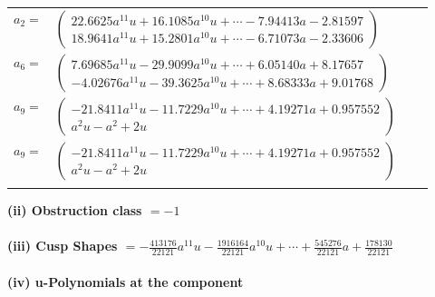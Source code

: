 \documentclass[1p]{elsarticle_modified}
\theoremstyle{definition}
\begin{document}
\begin{tabular}{m{7pt} m{180pt} m{7pt} m{180pt} }
\flushright $a_{2}=$&$\begin{pmatrix}22.6625 a^{11} u+16.1085 a^{10} u+\cdots-7.94413 a-2.81597\\18.9641 a^{11} u+15.2801 a^{10} u+\cdots-6.71073 a-2.33606\end{pmatrix}$ \\
\flushright $a_{6}=$&$\begin{pmatrix}7.69685 a^{11} u-29.9099 a^{10} u+\cdots+6.05140 a+8.17657\\-4.02676 a^{11} u-39.3625 a^{10} u+\cdots+8.68333 a+9.01768\end{pmatrix}$ \\
\flushright $a_{9}=$&$\begin{pmatrix}-21.8411 a^{11} u-11.7229 a^{10} u+\cdots+4.19271 a+0.957552\\a^2 u- a^2+2 u\end{pmatrix}$\\ \flushright $a_{9}=$&$\begin{pmatrix}-21.8411 a^{11} u-11.7229 a^{10} u+\cdots+4.19271 a+0.957552\\a^2 u- a^2+2 u\end{pmatrix}$\\&\end{tabular}
\flushleft \textbf{(ii) Obstruction class $= -1$}\\~\\
\flushleft \textbf{(iii) Cusp Shapes $= -\frac{413176}{22121} a^{11} u-\frac{1916164}{22121} a^{10} u+\cdots+\frac{545276}{22121} a+\frac{178130}{22121}$}\\~\\
\newpage\renewcommand{\arraystretch}{1}
\flushleft \textbf{(iv) u-Polynomials at the component}\newline \\
\end{document}
